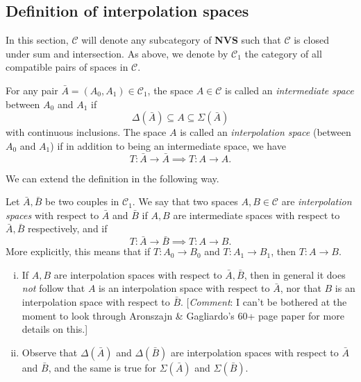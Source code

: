 \subsection{Definition of interpolation spaces}
In this section, $\mathscr{C}$ will denote any subcategory of \textbf{NVS} such that $\mathscr{C}$ is closed under sum and intersection. As above, we denote by $\mathscr{C}_1$ the category of all compatible pairs of spaces in $\mathscr{C}$.

\begin{definition}
For any pair $\bar{A}=(A_0,A_1)\in\mathscr{C}_1$, the space $A\in\mathscr{C}$ is called an \emph{intermediate space} between $A_0$ and $A_1$ if
\begin{equation*}
    \Delta(\bar{A}) \subseteq A \subseteq \Sigma(\bar{A})
\end{equation*}
with continuous inclusions. The space $A$ is called an \emph{interpolation space} (between $A_0$ and $A_1$) if in addition to being an intermediate space, we have
\begin{equation*}
    T:\bar{A}\to\bar{A} \implies T:A\to A.
\end{equation*}
\end{definition}

We can extend the definition in the following way.
\begin{definition}
Let $\bar{A},\bar{B}$ be two couples in $\mathscr{C}_1$. We say that two spaces $A,B\in\mathscr{C}$ are \emph{interpolation spaces} with respect to $\bar{A}$ and $\bar{B}$ if $A,B$ are intermediate spaces with respect to $\bar{A},\bar{B}$ respectively, and if
\begin{equation*}
    T:\bar{A}\to\bar{B} \implies T:A\to B.
\end{equation*}
More explicitly, this means that if $T:A_0\to B_0$ and $T:A_1\to B_1$, then $T:A\to B$.
\end{definition}

\begin{remark}
\begin{enumerate}[(i)]
    \item If $A,B$ are interpolation spaces with respect to $\bar{A},\bar{B}$, then in general it does \emph{not} follow that $A$ is an interpolation space with respect to $\bar{A}$, nor that $B$ is an interpolation space with respect to $\bar{B}$. [\emph{Comment}: I can't be bothered at the moment to look through Aronszajn \& Gagliardo's 60+ page paper for more details on this.]
    
    \item Observe that $\Delta(\bar{A})$ and $\Delta(\bar{B})$ are interpolation spaces with respect to $\bar{A}$ and $\bar{B}$, and the same is true for $\Sigma(\bar{A})$ and $\Sigma(\bar{B})$.
\end{enumerate}
\end{remark}

